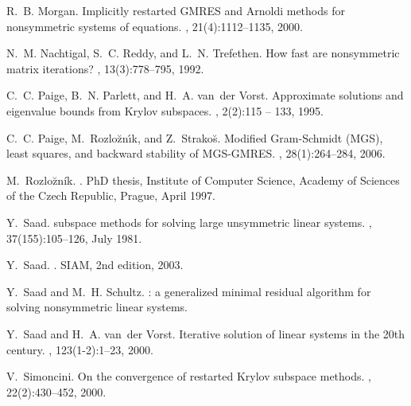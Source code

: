 \documentclass{article}
\begin{document}
\begin{thebibliography}{100}
 R.~B. Morgan. \newblock Implicitly restarted {GMRES} and {Arnoldi} methods for
nonsymmetric
systems of equations.
,
21(4):1112--1135, 2000.





 N.~M. Nachtigal, S.~C. Reddy, and L.~N. Trefethen. \newblock How fast are
    nonsymmetric matrix iterations? ,
  13(3):778--795, 1992.

   C.~C. Paige, B.~N. Parlett, and H.~A. van~der Vorst. \newblock Approximate
  solutions and eigenvalue bounds from {Krylov} subspaces. , 2(2):115 -- 133,
1995.

 C.~C. Paige, M.~Rozlo{\u{z}}n{\'{\i}}k, and Z.~Strako{\u{s}}. \newblock
  Modified {G}ram-{S}chmidt ({MGS}), least squares, and backward
stability of {MGS-GMRES}.
,
28(1):264--284, 2006.

 M.~Rozlo\u{z}ník. .
    \newblock PhD thesis, Institute of Computer Science, Academy of Sciences of the
  Czech Republic, Prague, April 1997.


 Y.~Saad.  subspace methods for solving large unsymmetric linear
  systems.
, 37(155):105--126, July 1981.

	 Y.~Saad. . \newblock SIAM,
	2nd edition, 2003.
	
	 Y.~Saad and M.~H. Schultz. : a generalized minimal residual
    algorithm for solving
  nonsymmetric linear systems.

   Y.~Saad and H.~A. van~der Vorst. \newblock Iterative solution of linear systems in
    the 20th century. ,
  123(1-2):1--23, 2000.


     V.~Simoncini. \newblock On the convergence of restarted {Krylov} subspace
    methods. ,
  22(2):430--452, 2000.


\end{thebibliography}
\end{document}
